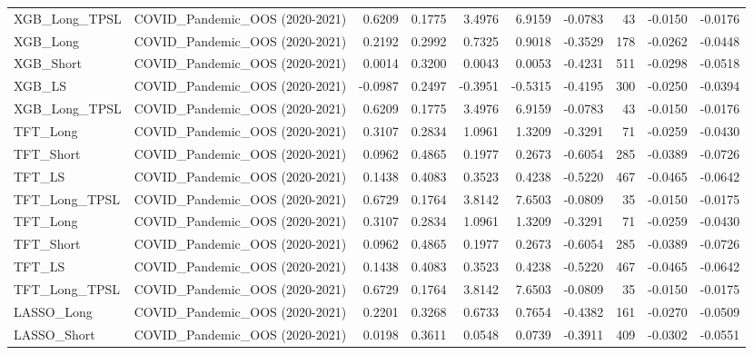 \begin{tabular}{llrrrrrrrr}
\cline{1-10}
XGB\_Long\_TPSL & COVID\_Pandemic\_OOS (2020-2021) & 0.6209 & 0.1775 & 3.4976 & 6.9159 & -0.0783 & 43 & -0.0150 & -0.0176 \\
\cline{1-10}
XGB\_Long & COVID\_Pandemic\_OOS (2020-2021) & 0.2192 & 0.2992 & 0.7325 & 0.9018 & -0.3529 & 178 & -0.0262 & -0.0448 \\
\cline{1-10}
XGB\_Short & COVID\_Pandemic\_OOS (2020-2021) & 0.0014 & 0.3200 & 0.0043 & 0.0053 & -0.4231 & 511 & -0.0298 & -0.0518 \\
\cline{1-10}
XGB\_LS & COVID\_Pandemic\_OOS (2020-2021) & -0.0987 & 0.2497 & -0.3951 & -0.5315 & -0.4195 & 300 & -0.0250 & -0.0394 \\
\cline{1-10}
XGB\_Long\_TPSL & COVID\_Pandemic\_OOS (2020-2021) & 0.6209 & 0.1775 & 3.4976 & 6.9159 & -0.0783 & 43 & -0.0150 & -0.0176 \\
\cline{1-10}
TFT\_Long & COVID\_Pandemic\_OOS (2020-2021) & 0.3107 & 0.2834 & 1.0961 & 1.3209 & -0.3291 & 71 & -0.0259 & -0.0430 \\
\cline{1-10}
TFT\_Short & COVID\_Pandemic\_OOS (2020-2021) & 0.0962 & 0.4865 & 0.1977 & 0.2673 & -0.6054 & 285 & -0.0389 & -0.0726 \\
\cline{1-10}
TFT\_LS & COVID\_Pandemic\_OOS (2020-2021) & 0.1438 & 0.4083 & 0.3523 & 0.4238 & -0.5220 & 467 & -0.0465 & -0.0642 \\
\cline{1-10}
TFT\_Long\_TPSL & COVID\_Pandemic\_OOS (2020-2021) & 0.6729 & 0.1764 & 3.8142 & 7.6503 & -0.0809 & 35 & -0.0150 & -0.0175 \\
\cline{1-10}
TFT\_Long & COVID\_Pandemic\_OOS (2020-2021) & 0.3107 & 0.2834 & 1.0961 & 1.3209 & -0.3291 & 71 & -0.0259 & -0.0430 \\
\cline{1-10}
TFT\_Short & COVID\_Pandemic\_OOS (2020-2021) & 0.0962 & 0.4865 & 0.1977 & 0.2673 & -0.6054 & 285 & -0.0389 & -0.0726 \\
\cline{1-10}
TFT\_LS & COVID\_Pandemic\_OOS (2020-2021) & 0.1438 & 0.4083 & 0.3523 & 0.4238 & -0.5220 & 467 & -0.0465 & -0.0642 \\
\cline{1-10}
TFT\_Long\_TPSL & COVID\_Pandemic\_OOS (2020-2021) & 0.6729 & 0.1764 & 3.8142 & 7.6503 & -0.0809 & 35 & -0.0150 & -0.0175 \\
\cline{1-10}
LASSO\_Long & COVID\_Pandemic\_OOS (2020-2021) & 0.2201 & 0.3268 & 0.6733 & 0.7654 & -0.4382 & 161 & -0.0270 & -0.0509 \\
\cline{1-10}
LASSO\_Short & COVID\_Pandemic\_OOS (2020-2021) & 0.0198 & 0.3611 & 0.0548 & 0.0739 & -0.3911 & 409 & -0.0302 & -0.0551 \\

\end{tabular}
